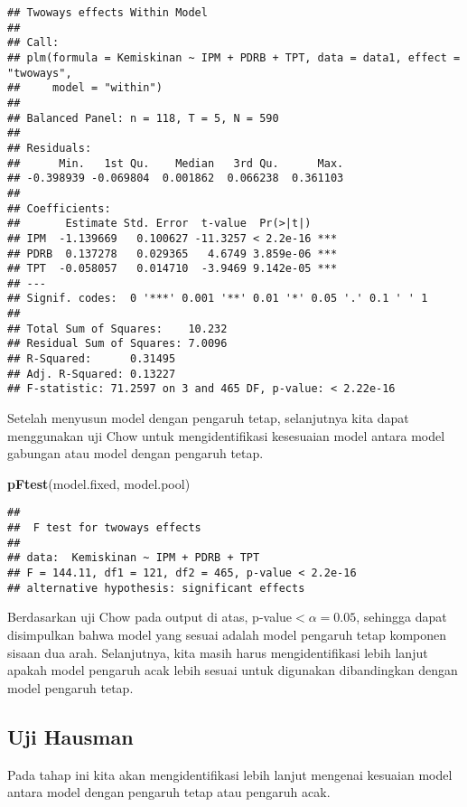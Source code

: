 \documentclass[
]{book}
\newenvironment{Shaded}{\begin{snugshade}}{\end{snugshade}}
\newcommand{\KeywordTok}[1]{\textcolor[rgb]{0.13,0.29,0.53}{\textbf{#1}}}
\newcommand{\NormalTok}[1]{#1}
\begin{document}
\begin{verbatim}
## Twoways effects Within Model
## 
## Call:
## plm(formula = Kemiskinan ~ IPM + PDRB + TPT, data = data1, effect = "twoways", 
##     model = "within")
## 
## Balanced Panel: n = 118, T = 5, N = 590
## 
## Residuals:
##      Min.   1st Qu.    Median   3rd Qu.      Max. 
## -0.398939 -0.069804  0.001862  0.066238  0.361103 
## 
## Coefficients:
##       Estimate Std. Error  t-value  Pr(>|t|)    
## IPM  -1.139669   0.100627 -11.3257 < 2.2e-16 ***
## PDRB  0.137278   0.029365   4.6749 3.859e-06 ***
## TPT  -0.058057   0.014710  -3.9469 9.142e-05 ***
## ---
## Signif. codes:  0 '***' 0.001 '**' 0.01 '*' 0.05 '.' 0.1 ' ' 1
## 
## Total Sum of Squares:    10.232
## Residual Sum of Squares: 7.0096
## R-Squared:      0.31495
## Adj. R-Squared: 0.13227
## F-statistic: 71.2597 on 3 and 465 DF, p-value: < 2.22e-16
\end{verbatim}

Setelah menyusun model dengan pengaruh tetap, selanjutnya kita dapat menggunakan uji Chow untuk mengidentifikasi kesesuaian model antara model gabungan atau model dengan pengaruh tetap.

\begin{Shaded}
\begin{Highlighting}[]
\KeywordTok{pFtest}\NormalTok{(model.fixed, model.pool)}
\end{Highlighting}
\end{Shaded}

\begin{verbatim}
## 
##  F test for twoways effects
## 
## data:  Kemiskinan ~ IPM + PDRB + TPT
## F = 144.11, df1 = 121, df2 = 465, p-value < 2.2e-16
## alternative hypothesis: significant effects
\end{verbatim}

Berdasarkan uji Chow pada output di atas, p-value\(<\alpha=0.05\), sehingga dapat disimpulkan bahwa model yang sesuai adalah model pengaruh tetap komponen sisaan dua arah. Selanjutnya, kita masih harus mengidentifikasi lebih lanjut apakah model pengaruh acak lebih sesuai untuk digunakan dibandingkan dengan model pengaruh tetap.

\hypertarget{uji-hausman}{%
\subsection{Uji Hausman}\label{uji-hausman}}

Pada tahap ini kita akan mengidentifikasi lebih lanjut mengenai kesuaian model antara model dengan pengaruh tetap atau pengaruh acak.
\end{document}
